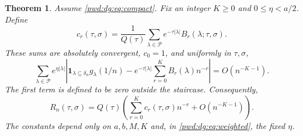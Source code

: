 \documentclass[11pt,letterpaper]{article}
\numberwithin{equation}{section}
\newtheorem{theorem}{Theorem}[section]
\theoremstyle{remark}\newtheorem{remark}[theorem]{Remark}
\newcommand{\ind}{\mathbf 1}
\newcommand{\Part}{\mathcal P}
\begin{document}
\begin{theorem}\label{pwd:dg:thm:uniform}
Assume \eqref{pwd:dg:eq:compact}. Fix an integer $K\ge0$ and $0\le\eta<a/2$. Define
\begin{equation}\label{pwd:dg:eq:coeff}
 c_r(\tau,\sigma)=\frac1{Q(\tau)}\sum_{\lambda\in\Part}
      e^{-\tau|\lambda|}B_r(\lambda;\tau,\sigma).
\end{equation}
These sums are absolutely convergent, $c_0=1$, and uniformly in $\tau,\sigma$,
\begin{equation}\label{pwd:dg:eq:weighted}
 \sum_{\lambda\in\Part}e^{\eta|\lambda|}
 \left|\ind_{\lambda\subseteq\delta_n}g_\lambda(1/n)
 -e^{-\tau|\lambda|}\sum_{r=0}^KB_r(\lambda)n^{-r}\right|
 =O(n^{-K-1}).
\end{equation}
The first term is defined to be zero outside the staircase. Consequently,
\begin{equation}\label{pwd:dg:eq:main}
 R_n(\tau,\sigma)=Q(\tau)\left(\sum_{r=0}^Kc_r(\tau,\sigma)n^{-r}
                                      +O(n^{-K-1})\right).
\end{equation}
The constants depend only on $a,b,M,K$ and, in \eqref{pwd:dg:eq:weighted}, the fixed $\eta$.
\end{theorem}
\end{document}
